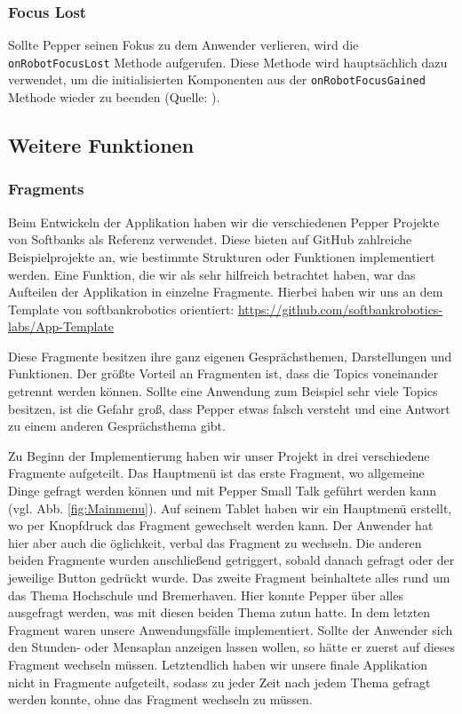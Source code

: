 \subsubsection{Focus Lost}
Sollte Pepper seinen Fokus zu dem Anwender verlieren, wird die \verb|onRobotFocusLost| Methode aufgerufen. Diese Methode wird hauptsächlich dazu verwendet, um die initialisierten Komponenten aus der \verb|onRobotFocusGained| Methode wieder zu beenden (Quelle: \cite{Robot_lifecycle}).\\

\subsection{Weitere Funktionen}

\subsubsection{Fragments}

Beim Entwickeln der Applikation haben wir die verschiedenen Pepper Projekte von Softbanks als Referenz verwendet. Diese bieten auf GitHub zahlreiche Beispielprojekte an, wie bestimmte Strukturen oder Funktionen implementiert werden. Eine Funktion, die wir als sehr hilfreich betrachtet haben, war das Aufteilen der Applikation in einzelne Fragmente. Hierbei haben wir uns an dem Template von softbankrobotics orientiert: \url{https://github.com/softbankrobotics-labs/App-Template}

Diese Fragmente besitzen ihre ganz eigenen Gesprächsthemen, Darstellungen und Funktionen. Der größte Vorteil an Fragmenten ist, dass die Topics voneinander getrennt werden können. Sollte eine Anwendung zum Beispiel sehr viele Topics besitzen, ist die Gefahr groß, dass Pepper etwas falsch versteht und eine Antwort zu einem anderen Gesprächsthema gibt.

Zu Beginn der Implementierung haben wir unser Projekt in drei verschiedene Fragmente aufgeteilt. Das Hauptmenü ist das erste Fragment, wo allgemeine Dinge gefragt werden können und mit Pepper Small Talk geführt werden kann (vgl. Abb. \ref{fig:Mainmenu}). Auf seinem Tablet haben wir ein Hauptmenü erstellt, wo per Knopfdruck das Fragment gewechselt werden kann. Der Anwender hat hier aber auch die öglichkeit, verbal das Fragment zu wechseln. Die anderen beiden Fragmente wurden anschließend getriggert, sobald danach gefragt oder der jeweilige Button gedrückt wurde. Das zweite Fragment beinhaltete alles rund um das Thema Hochschule und Bremerhaven. Hier konnte Pepper über alles ausgefragt werden, was mit diesen beiden Thema zutun hatte. In dem letzten Fragment waren unsere Anwendungsfälle implementiert. Sollte der Anwender sich den Stunden- oder Mensaplan anzeigen lassen wollen, so hätte er zuerst auf dieses Fragment wechseln müssen. Letztendlich haben wir unsere finale Applikation nicht in Fragmente aufgeteilt, sodass zu jeder Zeit nach jedem Thema gefragt werden konnte, ohne das Fragment wechseln zu müssen.\\

